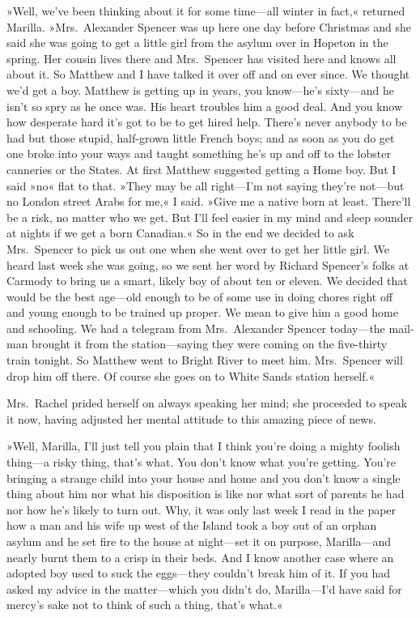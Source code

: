 »Well, we've been thinking about it for some time—all winter in fact,« returned Marilla. »Mrs.~Alexander Spencer was up here one day before Christmas and she said she was going to get a little girl from the asylum over in Hopeton in the spring. Her cousin lives there and Mrs.~Spencer has visited here and knows all about it. So Matthew and I have talked it over off and on ever since. We thought we'd get a boy. Matthew is getting up in years, you know—he's sixty—and he isn't so spry as he once was. His heart troubles him a good deal. And you know how desperate hard it's got to be to get hired help. There's never anybody to be had but those stupid, half-grown little French boys; and as soon as you do get one broke into your ways and taught something he's up and off to the lobster canneries or the States. At first Matthew suggested getting a Home boy. But I said »no« flat to that. »They may be all right—I'm not saying they're not—but no London street Arabs for me,« I said. »Give me a native born at least. There'll be a risk, no matter who we get. But I'll feel easier in my mind and sleep sounder at nights if we get a born Canadian.« So in the end we decided to ask Mrs.~Spencer to pick us out one when she went over to get her little girl. We heard last week she was going, so we sent her word by Richard Spencer's folks at Carmody to bring us a smart, likely boy of about ten or eleven. We decided that would be the best age—old enough to be of some use in doing chores right off and young enough to be trained up proper. We mean to give him a good home and schooling. We had a telegram from Mrs.~Alexander Spencer today—the mail-man brought it from the station—saying they were coming on the five-thirty train tonight. So Matthew went to Bright River to meet him. Mrs.~Spencer will drop him off there. Of course she goes on to White Sands station herself.«

Mrs.~Rachel prided herself on always speaking her mind; she proceeded to speak it now, having adjusted her mental attitude to this amazing piece of news.

»Well, Marilla, I'll just tell you plain that I think you're doing a mighty foolish thing—a risky thing, that's what. You don't know what you're getting. You're bringing a strange child into your house and home and you don't know a single thing about him nor what his disposition is like nor what sort of parents he had nor how he's likely to turn out. Why, it was only last week I read in the paper how a man and his wife up west of the Island took a boy out of an orphan asylum and he set fire to the house at night—set it on purpose, Marilla—and nearly burnt them to a crisp in their beds. And I know another case where an adopted boy used to suck the eggs—they couldn't break him of it. If you had asked my advice in the matter—which you didn't do, Marilla—I'd have said for mercy's sake not to think of such a thing, that's what.«

